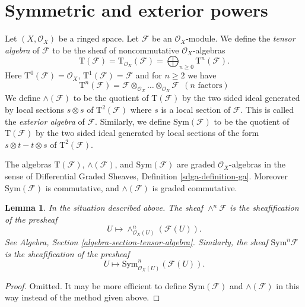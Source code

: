 \documentclass{stacks-project}
\theoremstyle{plain}
\newtheorem{lemma}[subsection]{Lemma}
\theoremstyle{definition}
\theoremstyle{remark}
\numberwithin{equation}{subsection}
\begin{document}
\section{Symmetric and exterior powers}
\label{section-symmetric-exterior}

\noindent
Let $(X, \mathcal{O}_X)$ be a ringed space.
Let $\mathcal{F}$ be an $\mathcal{O}_X$-module.
We define the {\it tensor algebra} of $\mathcal{F}$ to be
the sheaf of noncommutative $\mathcal{O}_X$-algebras
$$
\text{T}(\mathcal{F})
=
\text{T}_{\mathcal{O}_X}(\mathcal{F})
= \bigoplus\nolimits_{n \geq 0} \text{T}^n(\mathcal{F}).
$$
Here $\text{T}^0(\mathcal{F}) = \mathcal{O}_X$,
$\text{T}^1(\mathcal{F}) = \mathcal{F}$
and for $n \geq 2$ we have
$$
\text{T}^n(\mathcal{F}) =
\mathcal{F} \otimes_{\mathcal{O}_X} \ldots \otimes_{\mathcal{O}_X} \mathcal{F}
\ \ (n\text{ factors})
$$
We define $\wedge(\mathcal{F})$ to be the quotient of
$\text{T}(\mathcal{F})$ by the two sided ideal generated by
local sections $s \otimes s$ of $\text{T}^2(\mathcal{F})$ where
$s$ is a local section of $\mathcal{F}$. This is
called the {\it exterior algebra} of $\mathcal{F}$.
Similarly, we define $\text{Sym}(\mathcal{F})$ to be
the quotient of $\text{T}(\mathcal{F})$ by the two
sided ideal generated by local sections of the form
$s \otimes t - t \otimes s$ of $\text{T}^2(\mathcal{F})$.

\medskip\noindent
The algebras $\text{T}(\mathcal{F})$, $\wedge(\mathcal{F})$, and
$\text{Sym}(\mathcal{F})$ are graded $\mathcal{O}_X$-algebras
in the sense of Differential Graded Sheaves, Definition
\ref{sdga-definition-ga}.
Moreover $\text{Sym}(\mathcal{F})$
is commutative, and $\wedge(\mathcal{F})$ is graded commutative.

\begin{lemma}
\label{lemma-local-tensor-algebra}
In the situation described above.
The sheaf $\wedge^n\mathcal{F}$ is the sheafification of the
presheaf
$$
U \longmapsto \wedge^n_{\mathcal{O}_X(U)}(\mathcal{F}(U)).
$$
See Algebra, Section \ref{algebra-section-tensor-algebra}.
Similarly, the sheaf $\text{Sym}^n\mathcal{F}$ is the sheafification
of the presheaf
$$
U \longmapsto \text{Sym}^n_{\mathcal{O}_X(U)}(\mathcal{F}(U)).
$$
\end{lemma}

\begin{proof}
Omitted. It may be more efficient to define $\text{Sym}(\mathcal{F})$
and $\wedge(\mathcal{F})$ in this way instead of the method
given above.
\end{proof}
\end{document}
